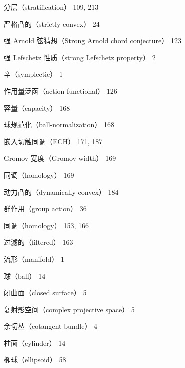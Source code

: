 {\noindent 分层（stratification） 109, 213\par
\noindent 严格凸的（strictly convex） 24\par
\noindent 强 Arnold 弦猜想（Strong Arnold chord conjecture） 123\par
\noindent 强 Lefschetz 性质（strong Lefschetz property） 2\par
\noindent 辛（symplectic） 1\par
\noindent\hspace*{1.5em}作用量泛函（action functional） 126\par
\noindent\hspace*{1.5em}容量（capacity） 168\par
\noindent\hspace*{3em}球规范化（ball-normalization） 168\par
\noindent\hspace*{3em}嵌入切触同调（ECH） 171, 187\par
\noindent\hspace*{3em}Gromov 宽度（Gromov width） 169\par
\noindent\hspace*{3em}同调（homology） 169\par
\noindent\hspace*{1.5em}动力凸的（dynamically convex） 184\par
\noindent\hspace*{1.5em}群作用（group action） 36\par
\noindent\hspace*{1.5em}同调（homology） 153, 166\par
\noindent\hspace*{3em}过滤的（filtered） 163\par
\noindent\hspace*{1.5em}流形（manifold） 1\par
\noindent\hspace*{3em}球（ball） 14\par
\noindent\hspace*{3em}闭曲面（closed surface） 5\par
\noindent\hspace*{3em}复射影空间（complex projective space） 5\par
\noindent\hspace*{3em}余切丛（cotangent bundle） 4\par
\noindent\hspace*{3em}柱面（cylinder） 14\par
\noindent\hspace*{3em}椭球（ellipsoid） 58\par
}
